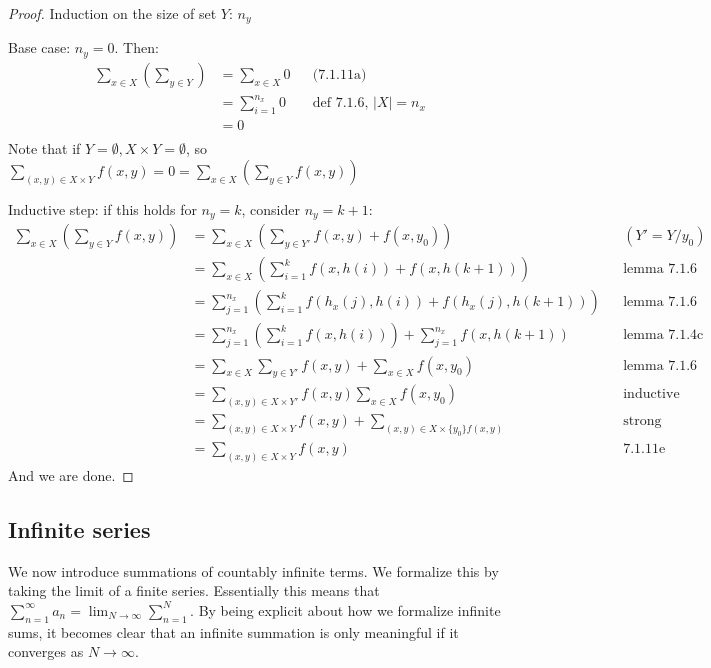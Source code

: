 \documentclass[answers,12pt]{exam}
\begin{document}
\begin{solution}
\begin{proof}
    Induction on the size of set $Y$: $n_y$

    Base case: $n_y=0$.
    Then:
    \[
        \begin{aligned}
            \sum_{x \in X}(\sum_{y \in Y}) &= \sum_{x \in X}0 && \text{(7.1.11a)} \\
            &= \sum_{i=1}^{n_x} 0 && \text{def 7.1.6, $|X| = n_x$} \\ 
            &= 0 \\
        \end{aligned}
    \]
    Note that if $Y = \emptyset, X \times Y = \emptyset$, so $\sum_{(x,y) \in X \times Y} f(x,y) = 0 = \sum_{x \in X}(\sum_{y \in Y} f(x,y))$

    Inductive step:
    if this holds for $n_y=k$, consider $n_y=k+1$:
    \[
        \begin{aligned}
            \sum_{x \in X}(\sum_{y \in Y} f(x,y)) &= \sum_{x \in X}(\sum_{y \in Y'}f(x,y) + f(x,y_0)) &&  (Y' = Y/{y_0}) \\
            &= \sum_{x \in X}(\sum_{i=1}^k f(x, h(i)) + f(x, h(k+1))) && \text{lemma 7.1.6}\\
            &= \sum_{j=1}^{n_x}(\sum_{i=1}^k f(h_x(j), h(i)) + f(h_x(j), h(k+1))) && \text{lemma 7.1.6}\\
            &= \sum_{j=1}^{n_x}(\sum_{i=1}^k f(x, h(i))) + \sum_{j=1}^{n_x}f(x, h(k+1)) && \text{lemma 7.1.4c}\\
            &=\sum_{x \in X} \sum_{y \in Y'} f(x,y) + \sum_{x \in X} f(x,y_0) && \text{lemma 7.1.6} \\
            &= \sum_{(x,y) \in X \times Y'} f(x,y) \sum_{x \in X} f(x, y_0) && \text{inductive step} \\
            &= \sum_{(x,y) \in X \times Y} f(x,y) + \sum_{(x,y)\in X \times \{y_0\}f(x,y)} && \text{strong induction? 7.1.11c?} \\
            &= \sum_{(x,y) \in X \times Y} f(x,y) && \text{7.1.11e}
        \end{aligned}
    \]
    And we are done.
\end{proof}
\end{solution}

\subsection{Infinite series}
We now introduce summations of countably infinite terms.
We formalize this by taking the limit of a finite series.
Essentially this means that $\sum_{n=1}^{\infty} a_n = \lim_{N \to \infty} \sum_{n=1}^{N}$.
By being explicit about how we formalize infinite sums, it becomes clear that an infinite summation is only meaningful if it converges as $N \to \infty$.
\end{document}
